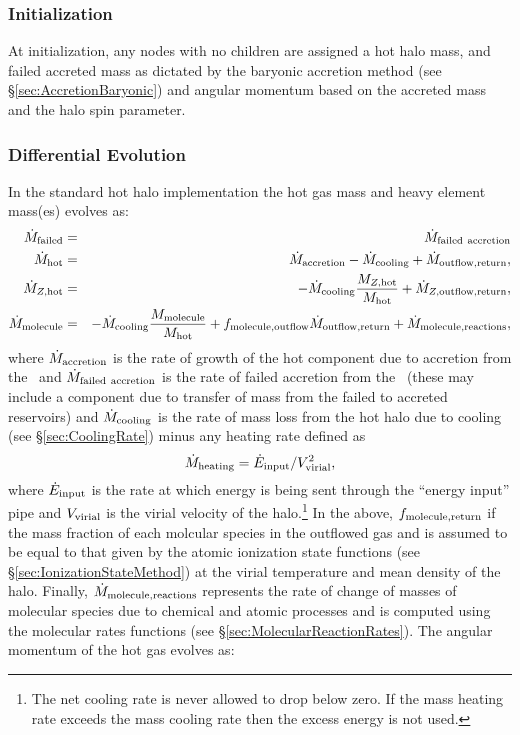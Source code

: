 \subsubsection{Initialization}

At initialization, any nodes with no children are assigned a hot halo mass, and failed accreted mass as dictated by the baryonic accretion method (see \S\ref{sec:AccretionBaryonic}) and angular momentum based on the accreted mass and the halo spin parameter.

\subsubsection{Differential Evolution}

In the standard hot halo implementation the hot gas mass and heavy element mass(es) evolves as:
\begin{eqnarray}
 \dot{M}_{\rm failed} &=& \dot{M}_{\rm failed~accretion} \\
 \dot{M}_{\rm hot} &=& \dot{M}_{\rm accretion} - \dot{M}_{\rm cooling} + \dot{M}_{\rm outflow,return}, \\
 \dot{M}_{Z, {\rm hot}} &=& - \dot{M}_{\rm cooling} {M_{Z, {\rm hot}}\over M_{\rm hot}} + \dot{M}_{Z, {\rm outflow,return}}, \\
 \dot{M}_{\rm molecule} &=& - \dot{M}_{\rm cooling} {M_{\rm molecule}\over M_{\rm hot}} + f_{\rm molecule,outflow} \dot{M}_{\rm outflow,return} + \dot{M}_{\rm molecule,reactions} , \\
\end{eqnarray}
where $\dot{M}_{\rm accretion}$ is the rate of growth of the hot component due to accretion from the \IGM\ and $\dot{M}_{\rm failed~accretion}$ is the rate of failed accretion from the \IGM\ (these may include a component due to transfer of mass from the failed to accreted reservoirs) and $\dot{M}_{\rm cooling}$ is the rate of mass loss from the hot halo due to cooling (see \S\ref{sec:CoolingRate}) minus any heating rate defined as
\begin{equation}
 \dot{M}_{\rm heating} = \dot{E}_{\rm input} / V_{\rm virial}^2,
\end{equation}
where $\dot{E}_{\rm input}$ is the rate at which energy is being sent through the ``energy input'' pipe and $V_{\rm virial}$ is the virial velocity of the halo.\footnote{The net cooling rate is never allowed to drop below zero. If the mass heating rate exceeds the mass cooling rate then the excess energy is not used.} In the above, $f_{\rm molecule,return}$ if the mass fraction of each molcular species in the outflowed gas and is assumed to be equal to that given by the atomic ionization state functions (see \S\ref{sec:IonizationStateMethod}) at the virial temperature and mean density of the halo. Finally, $\dot{M}_{\rm molecule,reactions}$ represents the rate of change of masses of molecular species due to chemical and atomic processes and is computed using the molecular rates functions (see \S\ref{sec:MolecularReactionRates}). The angular momentum of the hot gas evolves as:

